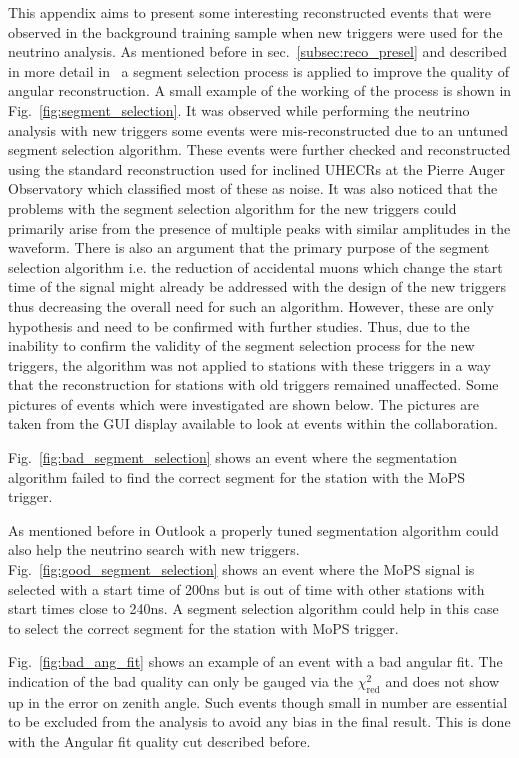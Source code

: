 This appendix aims to present some interesting reconstructed events that were observed in the background training sample when new triggers were used for the neutrino analysis. As mentioned before in sec.~\ref{subsec:reco_presel} and described in more detail in~\cite{gap_top_down_module} a segment selection process is applied to improve the quality of angular reconstruction. A small example of the working of the process is shown in Fig.~\ref{fig:segment_selection}. It was observed while performing the neutrino analysis with new triggers some events were mis-reconstructed due to an untuned segment selection algorithm. These events were further checked and reconstructed using the standard reconstruction used for inclined UHECRs at the Pierre Auger Observatory which classified most of these as noise. It was also noticed that the problems with the segment selection algorithm for the new triggers could primarily arise from the presence of multiple peaks with similar amplitudes in the waveform. There is also an argument that the primary purpose of the segment selection algorithm i.e. the reduction of accidental muons which change the start time of the signal might already be addressed with the design of the new triggers thus decreasing the overall need for such an algorithm. However, these are only hypothesis and need to be confirmed with further studies. Thus, due to the inability to confirm the validity of the segment selection process for the new triggers, the algorithm was not applied to stations with these triggers in a way that the reconstruction for stations with old triggers remained unaffected. Some pictures of events which were investigated are shown below. The pictures are taken from the GUI display available to look at events within the collaboration.

Fig.~\ref{fig:bad_segment_selection} shows an event where the segmentation algorithm failed to find the correct segment for the station with the MoPS trigger. 

As mentioned before in Outlook a properly tuned segmentation algorithm could also help the neutrino search with new triggers. Fig.~\ref{fig:good_segment_selection} shows an event where the MoPS signal is selected with a start time of 200ns but is out of time with other stations with start times close to 240ns. A segment selection algorithm could help in this case to select the correct segment for the station with MoPS trigger.

Fig.~\ref{fig:bad_ang_fit} shows an example of an event with a bad angular fit. The indication of the bad quality can only be gauged via the $\chi^2_{\text{red}}$ and does not show up in the error on zenith angle. Such events though small in number are essential to be excluded from the analysis to avoid any bias in the final result. This is done with the Angular fit quality cut described before. 


